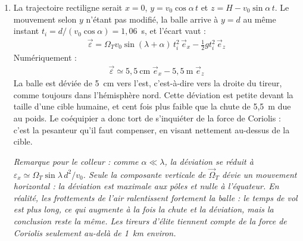 \begin{correction}
\begin{enumerate}
	\item La trajectoire rectiligne serait $x=0$, $y=v_0\cos\alpha\,t$ et $z=H-v_0\sin\alpha\,t$. Le mouvement selon $y$ n'étant pas modifié, la balle arrive à $y=d$ au même instant $t_i=d/(v_0\cos\alpha)=1{,}06$~s, et l'écart vaut :
	\begin{align*}
		\boxed{\vec{\varepsilon}=\Omega_Tv_0\sin(\lambda+\alpha)\,t_i^2\,\vec{e}_x-\frac{1}{2}gt_i^2\,\vec{e}_z}
	\end{align*}
	Numériquement :
	\begin{align*}
		\vec{\varepsilon}\simeq5{,}5~\text{cm}\;\vec{e}_x-5{,}5~\text{m}\;\vec{e}_z
	\end{align*}
	La balle est déviée de 5~cm vers l'est, c'est-à-dire vers la droite du tireur, comme toujours dans l'hémisphère nord. Cette déviation est petite devant la taille d'une cible humaine, et cent fois plus faible que la chute de 5,5~m due au poids. Le coéquipier a donc tort de s'inquiéter de la force de Coriolis : c'est la pesanteur qu'il faut compenser, en visant nettement au-dessus de la cible.

	\textit{Remarque pour le colleur : comme $\alpha\ll\lambda$, la déviation se réduit à $\varepsilon_x\simeq\Omega_T\sin\lambda\,d^2/v_0$. Seule la composante verticale de $\vec{\Omega}_T$ dévie un mouvement horizontal : la déviation est maximale aux pôles et nulle à l'équateur. En réalité, les frottements de l'air ralentissent fortement la balle : le temps de vol est plus long, ce qui augmente à la fois la chute et la déviation, mais la conclusion reste la même. Les tireurs d'élite tiennent compte de la force de Coriolis seulement au-delà de 1~km environ.}

\end{enumerate}

\end{correction}
